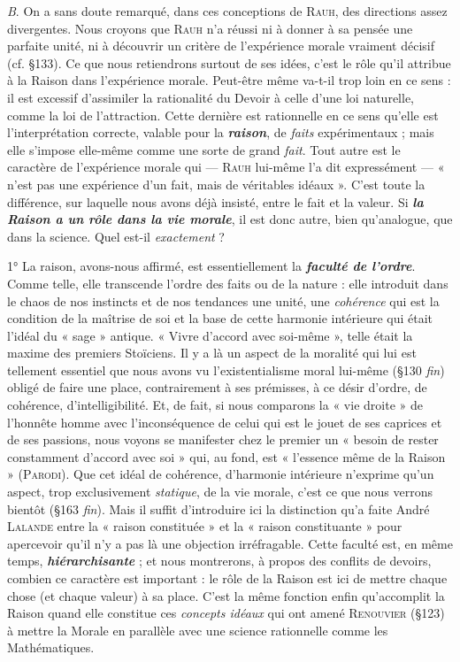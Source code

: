 {\it B}. On a sans doute remarqué, dans ces conceptions de \textsc{Rauh}, des
directions assez divergentes. Nous croyons que \textsc{Rauh} n’a réussi ni
à donner à sa pensée une parfaite unité, ni à découvrir un critère de
l'expérience morale vraiment décisif (cf. \S 133). Ce que nous retiendrons
surtout de ses idées, c’est le rôle qu’il attribue à la Raison dans
l'expérience morale. Peut-être même va-t-il trop loin en ce sens : il est
excessif d’assimiler la rationalité du Devoir à celle d’une loi naturelle,
comme la loi de l'attraction. Cette dernière est rationnelle en ce sens
qu’elle est l’interprétation correcte, valable pour la \textbf{\textit {raison}}, de {\it faits}
expérimentaux ; mais elle s’impose elle-même comme une sorte de
grand {\it fait}. Tout autre est le caractère de l'expérience morale qui —
\textsc{Rauh} lui-même l’a dit expressément — « n’est pas une expérience d’un
fait, mais de véritables idéaux ». C’est toute la différence, sur laquelle
nous avons déjà insisté, entre le fait et la valeur. Si \textbf{\textit {la Raison a un rôle
dans la vie morale}}, il est donc autre, bien qu’analogue, que dans la
science. Quel est-il {\it exactement} ?

1° La raison, avons-nous affirmé, est essentiellement la \textbf{\textit {faculté
de l’ordre}}. Comme telle, elle transcende l’ordre des faits ou de la
nature : elle introduit dans le chaos de nos instincts et de nos tendances
une unité, une {\it cohérence} qui est la condition de la maîtrise de soi et
la base de cette harmonie intérieure qui était l'idéal du « sage »
antique. « Vivre d’accord avec soi-même », telle était la maxime des
premiers Stoïciens. Il y a là un aspect de la moralité qui lui est tellement
essentiel que nous avons vu l’existentialisme moral lui-même
(\S 130 {\it fin}) obligé de faire une place, contrairement à ses prémisses,
à ce désir d’ordre, de cohérence, d’intelligibilité. Et, de fait, si nous
comparons la « vie droite » de l’honnête homme avec l’inconséquence
de celui qui est le jouet de ses caprices et de ses passions, nous voyons
se manifester chez le premier un « besoin de rester constamment
d’accord avec soi » qui, au fond, est « l'essence même de la Raison »
(\textsc{Parodi}). Que cet idéal de cohérence, d'harmonie intérieure n’exprime
qu’un aspect, trop exclusivement {\it statique}, de la vie morale, c'est ce
que nous verrons bientôt (\S 163 {\it fin}). Mais il suffit d'introduire ici
la distinction qu’a faite André \textsc{Lalande} entre la « raison constituée »
et la « raison constituante » pour apercevoir qu’il n’y a pas
là une objection irréfragable. Cette faculté est, en même temps,
\textbf{\textit {hiérarchisante}} ; et nous montrerons, à propos des conflits de devoirs,
combien ce caractère est important : le rôle de la Raison est ici de
mettre chaque chose (et chaque valeur) à sa place. C’est la même
fonction enfin qu’accomplit la Raison quand elle constitue ces {\it concepts
idéaux} qui ont amené \textsc{Renouvier} (\S 123) à mettre la Morale en
parallèle avec une science rationnelle comme les Mathématiques.

